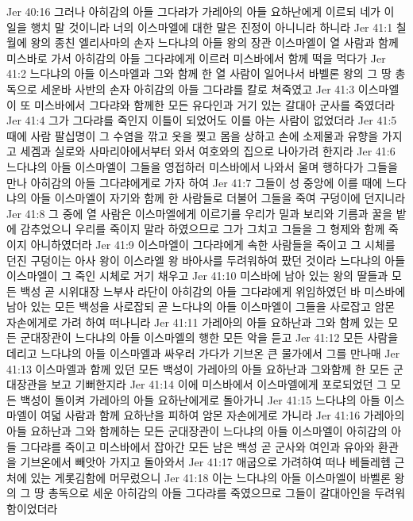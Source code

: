 Jer 40:16  그러나 아히감의 아들 그다랴가 가레아의 아들 요하난에게 이르되 네가 이 일을 행치 말 것이니라 너의 이스마엘에 대한 말은 진정이 아니니라 하니라
Jer 41:1  칠월에 왕의 종친 엘리사마의 손자 느다냐의 아들 왕의 장관 이스마엘이 열 사람과 함께 미스바로 가서 아히감의 아들 그다랴에게 이르러 미스바에서 함께 떡을 먹다가
Jer 41:2  느다냐의 아들 이스마엘과 그와 함께 한 열 사람이 일어나서 바벨론 왕의 그 땅 총독으로 세운바 사반의 손자 아히감의 아들 그다랴를 칼로 쳐죽였고
Jer 41:3  이스마엘이 또 미스바에서 그다랴와 함께한 모든 유다인과 거기 있는 갈대아 군사를 죽였더라
Jer 41:4  그가 그다랴를 죽인지 이틀이 되었어도 이를 아는 사람이 없었더라
Jer 41:5  때에 사람 팔십명이 그 수염을 깎고 옷을 찢고 몸을 상하고 손에 소제물과 유향을 가지고 세겜과 실로와 사마리아에서부터 와서 여호와의 집으로 나아가려 한지라
Jer 41:6  느다냐의 아들 이스마엘이 그들을 영접하러 미스바에서 나와서 울며 행하다가 그들을 만나 아히감의 아들 그다랴에게로 가자 하여
Jer 41:7  그들이 성 중앙에 이를 때에 느다냐의 아들 이스마엘이 자기와 함께 한 사람들로 더불어 그들을 죽여 구덩이에 던지니라
Jer 41:8  그 중에 열 사람은 이스마엘에게 이르기를 우리가 밀과 보리와 기름과 꿀을 밭에 감추었으니 우리를 죽이지 말라 하였으므로 그가 그치고 그들을 그 형제와 함께 죽이지 아니하였더라
Jer 41:9  이스마엘이 그다랴에게 속한 사람들을 죽이고 그 시체를 던진 구덩이는 아사 왕이 이스라엘 왕 바아사를 두려워하여 팠던 것이라 느다냐의 아들 이스마엘이 그 죽인 시체로 거기 채우고
Jer 41:10  미스바에 남아 있는 왕의 딸들과 모든 백성 곧 시위대장 느부사 라단이 아히감의 아들 그다랴에게 위임하였던 바 미스바에 남아 있는 모든 백성을 사로잡되 곧 느다냐의 아들 이스마엘이 그들을 사로잡고 암몬 자손에게로 가려 하여 떠나니라
Jer 41:11  가레아의 아들 요하난과 그와 함께 있는 모든 군대장관이 느다냐의 아들 이스마엘의 행한 모든 악을 듣고
Jer 41:12  모든 사람을 데리고 느다냐의 아들 이스마엘과 싸우러 가다가 기브온 큰 물가에서 그를 만나매
Jer 41:13  이스마엘과 함께 있던 모든 백성이 가레아의 아들 요하난과 그와함께 한 모든 군대장관을 보고 기뻐한지라
Jer 41:14  이에 미스바에서 이스마엘에게 포로되었던 그 모든 백성이 돌이켜 가레아의 아들 요하난에게로 돌아가니
Jer 41:15  느다냐의 아들 이스마엘이 여덟 사람과 함께 요하난을 피하여 암몬 자손에게로 가니라
Jer 41:16  가레아의 아들 요하난과 그와 함께하는 모든 군대장관이 느다냐의 아들 이스마엘이 아히감의 아들 그다랴를 죽이고 미스바에서 잡아간 모든 남은 백성 곧 군사와 여인과 유아와 환관을 기브온에서 빼앗아 가지고 돌아와서
Jer 41:17  애굽으로 가려하여 떠나 베들레헴 근처에 있는 게롯김함에 머무렀으니
Jer 41:18  이는 느다냐의 아들 이스마엘이 바벨론 왕의 그 땅 총독으로 세운 아히감의 아들 그다랴를 죽였으므로 그들이 갈대아인을 두려워함이었더라
